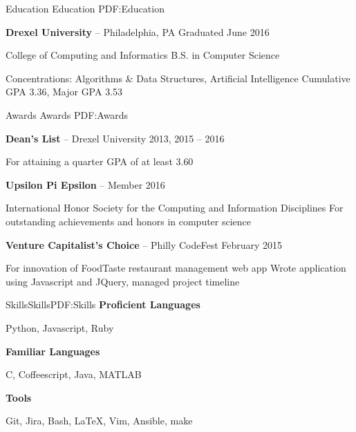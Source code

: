 \documentclass[letterpaper,MMMyyyy,nonstopmode]{simpleresumecv}
\begin{document}
\begin{Body}

\Section
{Education}
{Education}
{PDF:Education}

\Entry
{\textbf{Drexel University}} -- Philadelphia, PA
\hfill
Graduated June 2016

\Gap
College of Computing and Informatics
\Gap
B.S. in Computer Science
\medskip
\begin{Detail}
\BulletItem
Concentrations: Algorithms \& Data Structures, Artificial Intelligence
\BulletItem
Cumulative GPA 3.36, Major GPA 3.53
\end{Detail}


\Section
{Awards}
{Awards}
{PDF:Awards}

\Gap
\Entry
\textbf{Dean's List} -- Drexel University
\hfill
2013, 2015 -- 2016
\begin{Detail}
    \Item
    For attaining a quarter GPA of at least 3.60
\end{Detail}

\Gap
\Entry
\textbf{Upsilon Pi Epsilon} -- Member
\hfill
2016
\begin{Detail}
    \Item
    International Honor Society for the Computing and Information Disciplines
    \Item
    For outstanding achievements and honors in computer science
\end{Detail}

\Gap
\Entry
\textbf{Venture Capitalist's Choice} -- Philly CodeFest
\hfill
February 2015
\begin{Detail}
    \Item
    For innovation of FoodTaste restaurant management web app
    \Item
    Wrote application using Javascript and JQuery, managed project timeline
\end{Detail}


\Section
{Skills}{Skills}{PDF:Skills}
\Entry \textbf{Proficient Languages}
\begin{Detail}
    Python, Javascript, Ruby
\end{Detail}
\Entry \textbf{Familiar Languages}
\begin{Detail}
    C, Coffeescript, Java, MATLAB
\end{Detail}
\Entry \textbf{Tools}
\begin{Detail}
    Git, Jira, Bash, \LaTeX, Vim, Ansible, make
\end{Detail}




\end{Body}
\end{document}

